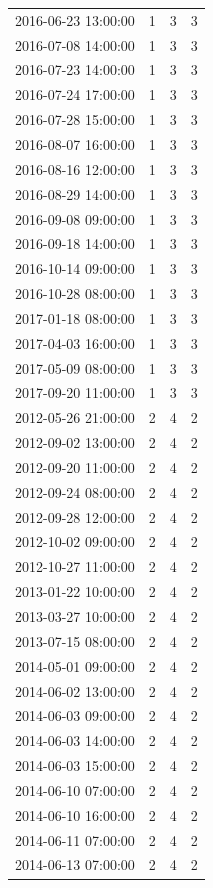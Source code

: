 \begin{tabular}{lrrr}
2016-06-23 13:00:00 & 1 & 3 & 3 \\
2016-07-08 14:00:00 & 1 & 3 & 3 \\
2016-07-23 14:00:00 & 1 & 3 & 3 \\
2016-07-24 17:00:00 & 1 & 3 & 3 \\
2016-07-28 15:00:00 & 1 & 3 & 3 \\
2016-08-07 16:00:00 & 1 & 3 & 3 \\
2016-08-16 12:00:00 & 1 & 3 & 3 \\
2016-08-29 14:00:00 & 1 & 3 & 3 \\
2016-09-08 09:00:00 & 1 & 3 & 3 \\
2016-09-18 14:00:00 & 1 & 3 & 3 \\
2016-10-14 09:00:00 & 1 & 3 & 3 \\
2016-10-28 08:00:00 & 1 & 3 & 3 \\
2017-01-18 08:00:00 & 1 & 3 & 3 \\
2017-04-03 16:00:00 & 1 & 3 & 3 \\
2017-05-09 08:00:00 & 1 & 3 & 3 \\
2017-09-20 11:00:00 & 1 & 3 & 3 \\
2012-05-26 21:00:00 & 2 & 4 & 2 \\
2012-09-02 13:00:00 & 2 & 4 & 2 \\
2012-09-20 11:00:00 & 2 & 4 & 2 \\
2012-09-24 08:00:00 & 2 & 4 & 2 \\
2012-09-28 12:00:00 & 2 & 4 & 2 \\
2012-10-02 09:00:00 & 2 & 4 & 2 \\
2012-10-27 11:00:00 & 2 & 4 & 2 \\
2013-01-22 10:00:00 & 2 & 4 & 2 \\
2013-03-27 10:00:00 & 2 & 4 & 2 \\
2013-07-15 08:00:00 & 2 & 4 & 2 \\
2014-05-01 09:00:00 & 2 & 4 & 2 \\
2014-06-02 13:00:00 & 2 & 4 & 2 \\
2014-06-03 09:00:00 & 2 & 4 & 2 \\
2014-06-03 14:00:00 & 2 & 4 & 2 \\
2014-06-03 15:00:00 & 2 & 4 & 2 \\
2014-06-10 07:00:00 & 2 & 4 & 2 \\
2014-06-10 16:00:00 & 2 & 4 & 2 \\
2014-06-11 07:00:00 & 2 & 4 & 2 \\
2014-06-13 07:00:00 & 2 & 4 & 2 \\

\end{tabular}
